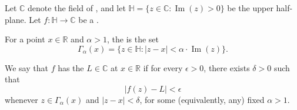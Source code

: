 \begin{definition} \label{definition:nontangential_limit_of_a_holomorphic_function_on_the_upper_half_plane}
Let $\mathbb{C}$ denote the field of , and let $\mathbb{H} = \{z \in \mathbb{C} : \operatorname{Im}(z) > 0\}$ be the upper half-plane. Let $f : \mathbb{H} \to \mathbb{C}$ be a .

For a point $x \in \mathbb{R}$ and $\alpha > 1$, the  is the set
$$\Gamma_\alpha(x) = \{z \in \mathbb{H} : |z - x| < \alpha \cdot \operatorname{Im}(z)\}.$$

We say that $f$ has the  $L \in \mathbb{C}$ at $x \in \mathbb{R}$ if for every $\epsilon > 0$, there exists $\delta > 0$ such that
$$|f(z) - L| < \epsilon$$
whenever $z \in \Gamma_\alpha(x)$ and $|z - x| < \delta$, for some (equivalently, any) fixed $\alpha > 1$.
\end{definition}